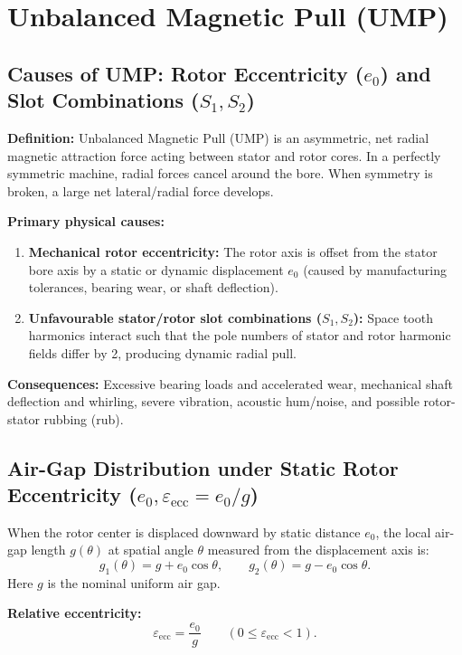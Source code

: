 \section{Unbalanced Magnetic Pull (UMP)}

\subsection{Causes of UMP: Rotor Eccentricity (\texorpdfstring{$e_0$}{e0}) and Slot Combinations (\texorpdfstring{$S_1, S_2$}{S1, S2})}
\textbf{Definition:} Unbalanced Magnetic Pull (UMP) is an asymmetric, net radial magnetic attraction force acting between stator and rotor cores. In a perfectly symmetric machine, radial forces cancel around the bore. When symmetry is broken, a large net lateral/radial force develops.

\textbf{Primary physical causes:}
\begin{enumerate}
  \item \textbf{Mechanical rotor eccentricity:} The rotor axis is offset from the stator bore axis by a static or dynamic displacement $e_0$ (caused by manufacturing tolerances, bearing wear, or shaft deflection).
  \item \textbf{Unfavourable stator/rotor slot combinations ($S_1, S_2$):} Space tooth harmonics interact such that the pole numbers of stator and rotor harmonic fields differ by 2, producing dynamic radial pull.
\end{enumerate}

\textbf{Consequences:} Excessive bearing loads and accelerated wear, mechanical shaft deflection and whirling, severe vibration, acoustic hum/noise, and possible rotor-stator rubbing (rub).

\subsection{Air-Gap Distribution under Static Rotor Eccentricity (\texorpdfstring{$e_0, \varepsilon_{\mathrm{ecc}} = e_0/g$}{e0, eps = e0/g})}
When the rotor center is displaced downward by static distance $e_0$, the local air-gap length $g(\theta)$ at spatial angle $\theta$ measured from the displacement axis is:
\begin{equation}
g_1(\theta) = g + e_0\cos\theta, \qquad g_2(\theta) = g - e_0\cos\theta.
\end{equation}
Here $g$ is the nominal uniform air gap.

\textbf{Relative eccentricity:}
\begin{equation}
\boxed{\varepsilon_{\mathrm{ecc}} = \frac{e_0}{g}} \qquad (0 \le \varepsilon_{\mathrm{ecc}} < 1).
\end{equation}

